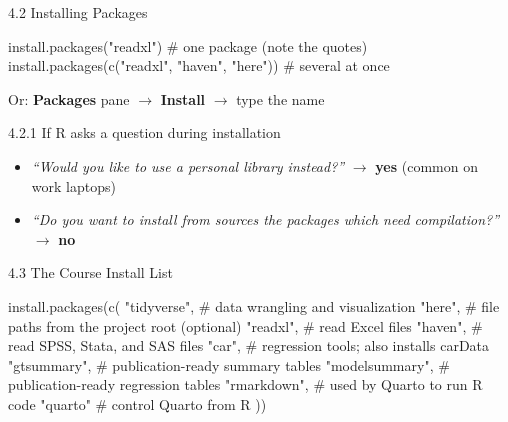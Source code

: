 \documentclass[
  ignorenonframetext,
  aspectratio=169,
]{beamer}
\newenvironment{Shaded}{\begin{snugshade}}{\end{snugshade}}
\newcommand{\CommentTok}[1]{\textcolor[rgb]{0.37,0.37,0.37}{#1}}
\newcommand{\FunctionTok}[1]{\textcolor[rgb]{0.28,0.35,0.67}{#1}}
\newcommand{\NormalTok}[1]{\textcolor[rgb]{0.00,0.23,0.31}{#1}}
\newcommand{\StringTok}[1]{\textcolor[rgb]{0.13,0.47,0.30}{#1}}
\providecommand{\tightlist}{%
  \setlength{\itemsep}{0pt}\setlength{\parskip}{0pt}}
\begin{document}
\begin{frame}[fragile]{4.2 Installing Packages}
\protect{}\label{installing-packages}
\begin{Shaded}
\begin{Highlighting}[]
\FunctionTok{install.packages}\NormalTok{(}\StringTok{"readxl"}\NormalTok{)                       }\CommentTok{\# one package (note the quotes)}
\FunctionTok{install.packages}\NormalTok{(}\FunctionTok{c}\NormalTok{(}\StringTok{"readxl"}\NormalTok{, }\StringTok{"haven"}\NormalTok{, }\StringTok{"here"}\NormalTok{))   }\CommentTok{\# several at once}
\end{Highlighting}
\end{Shaded}

Or: \textbf{Packages} pane \(\rightarrow\) \textbf{Install}
\(\rightarrow\) type the name

\begin{exampleblock}{4.2.1 If R asks a question during installation}
\protect{}\label{if-r-asks-a-question-during-installation}
\begin{itemize}
\tightlist
\item
  \emph{``Would you like to use a personal library instead?''}
  \(\rightarrow\) \textbf{yes} (common on work laptops)
\item
  \emph{``Do you want to install from sources the packages which need
  compilation?''} \(\rightarrow\) \textbf{no}
\end{itemize}
\end{exampleblock}
\end{frame}

\begin{frame}[fragile]{4.3 The Course Install List}
\protect{}\label{sec-course-packages}
\begin{Shaded}
\begin{Highlighting}[]
\FunctionTok{install.packages}\NormalTok{(}\FunctionTok{c}\NormalTok{(}
  \StringTok{"tidyverse"}\NormalTok{,     }\CommentTok{\# data wrangling and visualization}
  \StringTok{"here"}\NormalTok{,          }\CommentTok{\# file paths from the project root (optional)}
  \StringTok{"readxl"}\NormalTok{,        }\CommentTok{\# read Excel files}
  \StringTok{"haven"}\NormalTok{,         }\CommentTok{\# read SPSS, Stata, and SAS files}
  \StringTok{"car"}\NormalTok{,           }\CommentTok{\# regression tools; also installs carData}
  \StringTok{"gtsummary"}\NormalTok{,     }\CommentTok{\# publication{-}ready summary tables}
  \StringTok{"modelsummary"}\NormalTok{,  }\CommentTok{\# publication{-}ready regression tables}
  \StringTok{"rmarkdown"}\NormalTok{,     }\CommentTok{\# used by Quarto to run R code}
  \StringTok{"quarto"}         \CommentTok{\# control Quarto from R}
\NormalTok{))}
\end{Highlighting}
\end{Shaded}
\end{frame}
\end{document}
